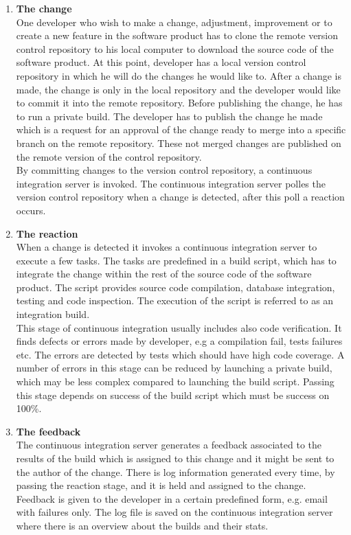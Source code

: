 \begin{enumerate}

    \item \textbf{The change}\\[0.1em]
          One developer who wish to make a change, adjustment, improvement or to create a new feature in the software product has to clone the remote version control repository to his local computer to download the source code of the software product. At this point, developer has a local version control repository in which he will do the changes he would like to. After a change is made, the change is only in the local repository and the developer would like to commit it into the remote repository. Before publishing the change, he has to run a private build. The developer has to publish the change he made which is a request for an approval of the change ready to merge into a specific branch on the remote repository. These not merged changes are published on the remote version of the control repository.\\[0.1em]
          By committing changes to the version control repository, a continuous integration server is invoked. The continuous integration server polles the version control repository when a change is detected, after this poll a reaction occurs.

    \item \textbf{The reaction}\\[0.1em]
          When a change is detected it invokes a continuous integration server to execute a few tasks. The tasks are predefined in a build script, which has to integrate the change within the rest of the source code of the software product. The script provides source code compilation, database integration, testing and code inspection. The execution of the script is referred to as an integration build.\\[0.1em]
          This stage of continuous integration usually includes also code verification. It finds defects or errors made by developer, e.g a compilation fail, tests failures etc. The errors are detected by tests which should have high code coverage. A number of errors in this stage can be reduced by launching a private build, which may be less complex compared to launching the build script. Passing this stage depends on success of the build script which must be success on 100\%.

    \item \textbf{The feedback}\\[0.1em]
          The continuous integration server generates a feedback associated to the results of the build which is assigned to this change and it might be sent to the author of the change. There is log information generated every time, by passing the reaction stage, and it is held and assigned to the change. Feedback is given to the developer in a certain predefined form, e.g. email with failures only. The log file is saved on the continuous integration server where there is an overview about the builds and their stats.


\end{enumerate}
